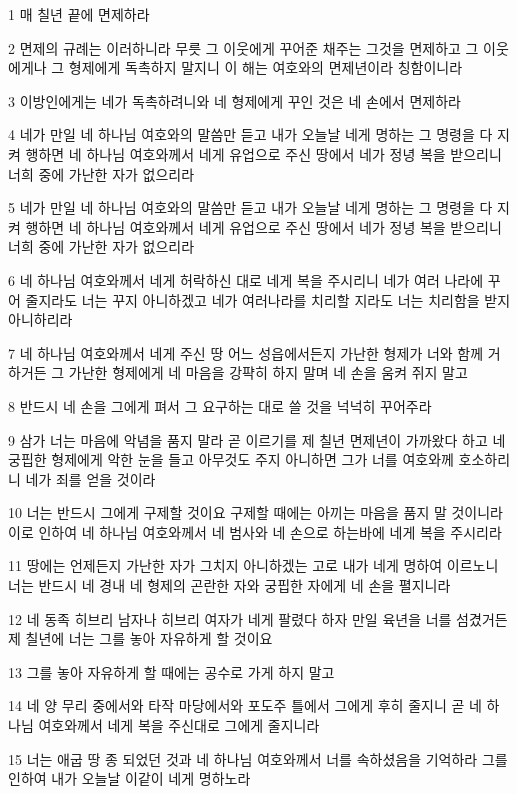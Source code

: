 \par 1 매 칠년 끝에 면제하라
\par 2 면제의 규례는 이러하니라 무릇 그 이웃에게 꾸어준 채주는 그것을 면제하고 그 이웃에게나 그 형제에게 독촉하지 말지니 이 해는 여호와의 면제년이라 칭함이니라
\par 3 이방인에게는 네가 독촉하려니와 네 형제에게 꾸인 것은 네 손에서 면제하라
\par 4 네가 만일 네 하나님 여호와의 말씀만 듣고 내가 오늘날 네게 명하는 그 명령을 다 지켜 행하면 네 하나님 여호와께서 네게 유업으로 주신 땅에서 네가 정녕 복을 받으리니 너희 중에 가난한 자가 없으리라
\par 5 네가 만일 네 하나님 여호와의 말씀만 듣고 내가 오늘날 네게 명하는 그 명령을 다 지켜 행하면 네 하나님 여호와께서 네게 유업으로 주신 땅에서 네가 정녕 복을 받으리니 너희 중에 가난한 자가 없으리라
\par 6 네 하나님 여호와께서 네게 허락하신 대로 네게 복을 주시리니 네가 여러 나라에 꾸어 줄지라도 너는 꾸지 아니하겠고 네가 여러나라를 치리할 지라도 너는 치리함을 받지 아니하리라
\par 7 네 하나님 여호와께서 네게 주신 땅 어느 성읍에서든지 가난한 형제가 너와 함께 거하거든 그 가난한 형제에게 네 마음을 강퍅히 하지 말며 네 손을 움켜 쥐지 말고
\par 8 반드시 네 손을 그에게 펴서 그 요구하는 대로 쓸 것을 넉넉히 꾸어주라
\par 9 삼가 너는 마음에 악념을 품지 말라 곧 이르기를 제 칠년 면제년이 가까왔다 하고 네 궁핍한 형제에게 악한 눈을 들고 아무것도 주지 아니하면 그가 너를 여호와께 호소하리니 네가 죄를 얻을 것이라
\par 10 너는 반드시 그에게 구제할 것이요 구제할 때에는 아끼는 마음을 품지 말 것이니라 이로 인하여 네 하나님 여호와께서 네 범사와 네 손으로 하는바에 네게 복을 주시리라
\par 11 땅에는 언제든지 가난한 자가 그치지 아니하겠는 고로 내가 네게 명하여 이르노니 너는 반드시 네 경내 네 형제의 곤란한 자와 궁핍한 자에게 네 손을 펼지니라
\par 12 네 동족 히브리 남자나 히브리 여자가 네게 팔렸다 하자 만일 육년을 너를 섬겼거든 제 칠년에 너는 그를 놓아 자유하게 할 것이요
\par 13 그를 놓아 자유하게 할 때에는 공수로 가게 하지 말고
\par 14 네 양 무리 중에서와 타작 마당에서와 포도주 틀에서 그에게 후히 줄지니 곧 네 하나님 여호와께서 네게 복을 주신대로 그에게 줄지니라
\par 15 너는 애굽 땅 종 되었던 것과 네 하나님 여호와께서 너를 속하셨음을 기억하라 그를 인하여 내가 오늘날 이같이 네게 명하노라
